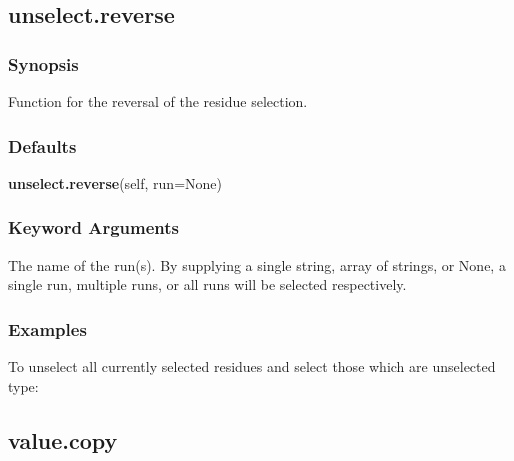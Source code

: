 




  

 \newpage 

 \subsection{unselect.reverse} 

  
 \subsubsection{Synopsis} 

 Function for the reversal of the residue selection. 
  

  
 \subsubsection{Defaults} 

 \textsf{\textbf{unselect.reverse}(self, run=None)} 

  
 \subsubsection{Keyword Arguments} 

   The name of the run(s).  By supplying a single string, array of strings, or None, a single run, multiple runs, or all runs will be selected respectively.  

  

  
 \subsubsection{Examples} 

 To unselect all currently selected residues and select those which are unselected type: 
  


  

 \newpage 

 \subsection{value.copy} 

